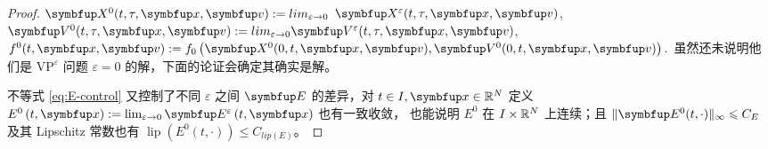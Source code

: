 \begin{proof}
$\vect{X}^{0}(t, \tau, \vx, \vv):= lim _{\varepsilon \rightarrow 0}$ $\vect{X}^{\varepsilon}(t, \tau, \vx, \vv)$, $\vect{V}^{0}(t, \tau, \vx, \vv):= lim _{\varepsilon \rightarrow 0} \vect{V}^{\varepsilon}(t, \tau, \vx, \vv)$, $f^{0}(t, \vx, \vv):=f_{0}\left(\vect{X}^{0}(0, t, \vx, \vv), \vect{V}^{0}(0, t, \vx, \vv)\right) .$ 虽然还未说明他们是 $\text{VP}^\varepsilon$ 问题 $\varepsilon=0$ 的解，下面的论证会确定其确实是解。







不等式 \ref{eq:E-control} 又控制了不同 $\varepsilon$ 之间 $\vE$ 的差异，对 $t \in I, \vx \in \bbR^{N}$ 定义 $E^{0}\left(t, \vx\right):=\lim _{\varepsilon \rightarrow 0} \vE^{\varepsilon}\left(t, \vx\right) $ 也有一致收敛，
也能说明 $E^{0}$ 在 $I \times {\mathbb{R}}^{N}$ 上连续；且 $\|\vE^{0}(t, \cdot)\|_{\infty} \leqslant C_{E}$ 及其 Lipschitz 常数也有 $\operatorname{lip}\left(E^{0}(t, \cdot)\right) \leqslant C_{lip(E)}$。




\end{proof}
